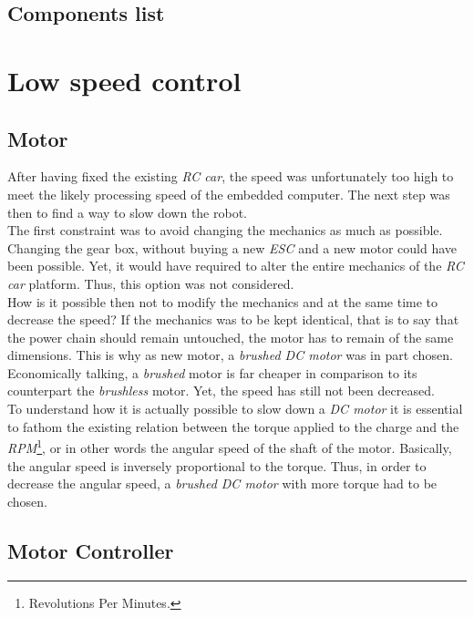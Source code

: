 		\subsection{Components list}
		
	\section{Low speed control}\label{motor}
	
		\subsection{Motor}
		
		After having fixed the existing \textit{RC car}, the speed was unfortunately 
		too high to meet the likely processing speed of the embedded computer.
		The next step
		was then to find a way to slow down the robot. 
		\\\indent The first constraint was to avoid changing the mechanics as much as
		possible. Changing the gear box, without buying a new \textit{ESC} and a new
		motor could have been possible. Yet, it would have required to alter 
		the entire mechanics of the \textit{RC car} platform. Thus, this option was 
		not considered.
		\\\indent How is it possible then not to modify the mechanics and
		at the same time to decrease the speed? If the mechanics was to 
		be kept identical, that is to say that the power chain should 
		remain untouched, the motor has to remain of the same dimensions.
		This is why as new motor, a \textit{brushed DC motor} was in part 
		chosen. Economically talking, a \textit{brushed} motor is far cheaper
		in comparison to its counterpart the \textit{brushless} motor. Yet, the
		speed has still not been decreased.
		\\\indent To understand how it is actually possible to 
		slow down a \textit{DC motor} it is essential to fathom the 
		existing relation between the torque applied to the charge
		and the \textit{RPM}\footnote{Revolutions Per Minutes.},
		or in other words the angular speed 
		of the shaft of the motor. Basically, the angular speed is
		inversely proportional 
		to the torque. Thus, in order to decrease the angular speed, a 
		\textit{brushed DC motor} with more torque had to be chosen. \cite{bonanza, motor}
		
		\subsection{Motor Controller}
		
